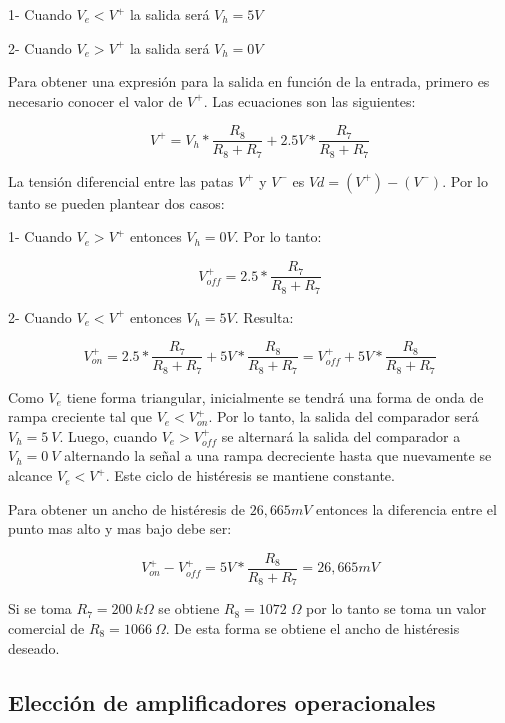 1- Cuando $V_e<V^+$ la salida será $V_h=5V$

2- Cuando $V_e>V^+$ la salida será $V_h=0V$

Para obtener una expresión para la salida en función de la entrada, primero es necesario conocer el valor de $V^+$.
Las ecuaciones son las siguientes:

\begin{equation} 
	V^+ = V_h*\frac{R_{8}}{R_{8}+R_{7}} + 2.5V*\frac{R_{7}}{R_{8}+R_{7}}
\end{equation} 

La tensión diferencial entre las patas $V^+$ y $V^-$ es $Vd=(V^+)-(V^-)$. Por lo tanto se pueden plantear dos casos: 

1- Cuando $V_e>V^+$ entonces $V_h=0V$. Por lo tanto:

\begin{equation}
	V^+_{off}=2.5*\frac{R_{7}}{R_{8}+R_{7}}
\end{equation}

2- Cuando $V_e<V^+$ entonces $V_h=5V$. Resulta:

\begin{equation}
	V^+_{on}=2.5*\frac{R_{7}}{R_{8}+R_{7}} + 5V*\frac{R_{8}}{R_{8}+R_{7}}=V^+_{off}+5V*\frac{R_{8}}{R_{8}+R_{7}}
\end{equation}

Como $V_{e}$ tiene forma triangular, inicialmente se tendrá una forma de onda de rampa creciente tal que $V_e < V^+_{on}$. Por lo tanto, la salida del comparador será $V_{h}=5\:V$. Luego, cuando $V_e > V^+_{off}$ se alternará la salida del comparador a $V_{h}=0\:V$ alternando la señal a una rampa decreciente hasta que nuevamente se alcance $V_e<V^+$. Este ciclo de histéresis se mantiene constante.

Para obtener un ancho de histéresis de $26,665 mV$ entonces la diferencia entre el punto mas alto y mas bajo debe ser:

\begin{equation}
	V^+_{on}-V^+_{off} = 5V*\frac{R_{8}}{R_{8}+R_{7}}= 26,665 mV
\end{equation}

Si se toma $R_{7}=200 \:k\Omega$ se obtiene $R_{8}=1072 \;\Omega$ por lo tanto se toma un valor comercial de $R_{8}=1066\:\Omega$. De esta forma se obtiene el ancho de histéresis deseado.

\subsection{Elección de amplificadores operacionales}

